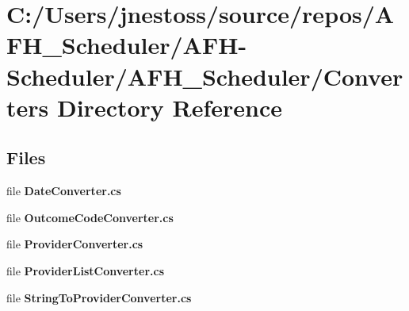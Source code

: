 \section{C\+:/\+Users/jnestoss/source/repos/\+A\+F\+H\+\_\+\+Scheduler/\+A\+F\+H-\/\+Scheduler/\+A\+F\+H\+\_\+\+Scheduler/\+Converters Directory Reference}
\label{dir_747152fb744db67e7d96be26dc608e0d}
\subsection*{Files}
\begin{DoxyCompactItemize}
\item 
file \textbf{ Date\+Converter.\+cs}
\item 
file \textbf{ Outcome\+Code\+Converter.\+cs}
\item 
file \textbf{ Provider\+Converter.\+cs}
\item 
file \textbf{ Provider\+List\+Converter.\+cs}
\item 
file \textbf{ String\+To\+Provider\+Converter.\+cs}
\end{DoxyCompactItemize}
